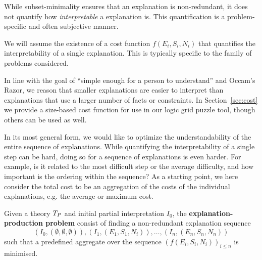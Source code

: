 While subset-minimality ensures that an explanation is non-redundant, it does not quantify how \textit{interpretable} a explanation is. 
This quantification is a problem-specific and often subjective manner. 

We will assume the existence of a cost function $f(E_i,S_i,N_i)$ that quantifies the interpretability of a single explanation. 
This is typically specific to the family of problems considered.

In line with the goal of ``simple enough for a person to understand'' and Occam's Razor, we reason that smaller explanations are easier to interpret than explanations that use a larger number of facts or constraints. %
In Section~\ref{sec:cost} we provide a size-based cost function for use in our logic grid puzzle tool, though others can be used as well.

In its most general form, we would like to optimize the understandability of the entire sequence of explanations. 
While quantifying the interpretability of a single step can be hard, doing so for a sequence of explanations is even harder. For example, is it related to the most difficult step or the average difficulty, and how important is the ordering within the sequence?
As a starting point, we here consider the total cost to be an aggregation of the costs of the individual explanations, e.g. the average or maximum cost.

\begin{definition}
Given a theory $T_P$ and initial partial interpretation $I_0$, the \textbf{explanation-production problem} consist of finding a non-redundant explanation sequence
\[(I_0,(\emptyset,\emptyset,\emptyset)), (I_1,(E_1,S_1,N_i)), \dots ,(I_n,(E_n,S_n,N_n))\]
such that a predefined aggregate over the sequence $\left(f(E_i,S_i,N_i)\right)_{i\leq n}$ is minimised.
\end{definition} 

